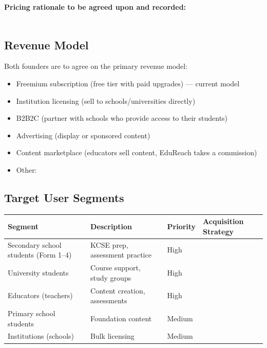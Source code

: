\documentclass[12pt,a4paper]{article}
\newcommand{\blank}[1][5.5cm]{\underline{\hspace{#1}}}
\newcommand{\cb}{$\square$\;}                   %
\begin{document}
\medskip
\noindent\textbf{Pricing rationale to be agreed upon and recorded:}\\[0.4em]
\noindent\blank[14cm]\\[0.4em]
\noindent\blank[14cm]

\subsection{Revenue Model}

Both founders are to agree on the primary revenue model:

\begin{itemize}[label=\cb]
  \item Freemium subscription (free tier with paid upgrades) --- current model
  \item Institution licensing (sell to schools/universities directly)
  \item B2B2C (partner with schools who provide access to their students)
  \item Advertising (display or sponsored content)
  \item Content marketplace (educators sell content, EduReach takes a commission)
  \item Other: \blank[6cm]
\end{itemize}

\subsection{Target User Segments}

\begin{tabularx}{\linewidth}{L{3.5cm} L{4cm} L{3cm} X}
  \toprule
  \textbf{Segment} & \textbf{Description} & \textbf{Priority} & \textbf{Acquisition Strategy} \\
  \midrule
  Secondary school students (Form 1--4) & KCSE prep, assessment practice & High    & \blank[4cm] \\[0.5em]
  University students                   & Course support, study groups   & High    & \blank[4cm] \\[0.5em]
  Educators (teachers)                  & Content creation, assessments  & High    & \blank[4cm] \\[0.5em]
  Primary school students               & Foundation content             & Medium  & \blank[4cm] \\[0.5em]
  Institutions (schools)                & Bulk licensing                 & Medium  & \blank[4cm] \\
  \bottomrule
\end{tabularx}
\end{document}
